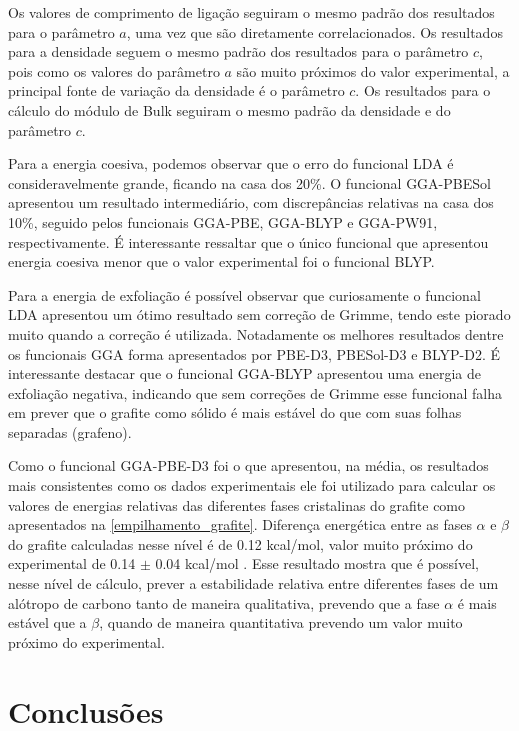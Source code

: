 		Os valores de comprimento de ligação seguiram o mesmo padrão dos resultados para o parâmetro $a$, uma vez que são diretamente correlacionados. Os resultados para a densidade seguem o mesmo padrão dos resultados para o parâmetro $c$, pois como os valores do parâmetro $a$ são muito próximos do valor experimental, a principal fonte de variação da densidade é o parâmetro $c$. Os resultados para o cálculo do módulo de Bulk seguiram o mesmo padrão da densidade e do parâmetro $c$. 
		
		Para a energia coesiva, podemos observar que o erro do funcional LDA é consideravelmente grande, ficando na casa dos 20\%. O funcional GGA-PBESol apresentou um resultado intermediário, com discrepâncias relativas na casa dos 10\%, seguido pelos funcionais GGA-PBE, GGA-BLYP e GGA-PW91, respectivamente. É interessante ressaltar que o único funcional que apresentou energia coesiva menor que o valor experimental foi o funcional BLYP. 
		
		Para a energia de exfoliação é possível observar que curiosamente o funcional LDA apresentou um ótimo resultado sem correção de Grimme, tendo este piorado muito quando a correção é utilizada. Notadamente os melhores resultados dentre os funcionais GGA forma apresentados por PBE-D3, PBESol-D3 e BLYP-D2. É interessante destacar que o funcional GGA-BLYP apresentou uma energia de exfoliação negativa, indicando que sem correções de Grimme esse funcional falha em prever que o grafite como sólido é mais estável do que com suas folhas separadas (grafeno). 
		
		Como o funcional GGA-PBE-D3 foi o que apresentou, na média, os resultados mais consistentes como os dados experimentais ele foi utilizado para calcular os valores de energias relativas das diferentes fases cristalinas do grafite como apresentados na \autoref{empilhamento_grafite}. Diferença energética entre as fases $\alpha$ e $\beta$ do grafite calculadas nesse nível é de 0.12 kcal/mol, valor muito próximo do experimental de 0.14 $\pm$ 0.04 kcal/mol \cite{greenwood2012chemistry}. Esse resultado mostra que é possível, nesse nível de cálculo, prever a estabilidade relativa entre diferentes fases de um alótropo de carbono tanto de maneira qualitativa, prevendo que a fase $\alpha$ é mais estável que a $\beta$, quando de maneira quantitativa prevendo um valor muito próximo do experimental. 
		
	
	\section{Conclusões}
	

